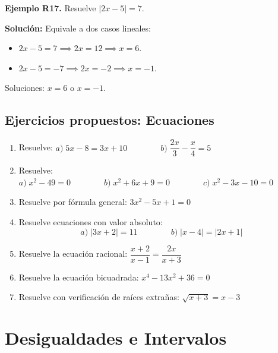 \documentclass[12pt, letterpaper]{article}
\begin{document}
\newpage

\textbf{Ejemplo R17.} Resuelve $|2x - 5| = 7$.

\begin{cuadrosolucion}
      \textbf{Solución:}
      Equivale a dos casos lineales:
      \begin{itemize}
            \item $2x - 5 = 7 \implies 2x = 12 \implies x = 6$.
            \item $2x - 5 = -7 \implies 2x = -2 \implies x = -1$.
      \end{itemize}
      Soluciones: $x = 6$ o $x = -1$.
\end{cuadrosolucion}

\subsection{Ejercicios propuestos: Ecuaciones}

\begin{enumerate}[resume=ejercicios, leftmargin=*]
      \item \facil{} Resuelve: $a)\; 5x - 8 = 3x + 10 \qquad\qquad b)\; \dfrac{2x}{3} - \dfrac{x}{4} = 5$

      \item \facil{} Resuelve: $a)\; x^2 - 49 = 0 \qquad\qquad b)\; x^2 + 6x + 9 = 0 \qquad\qquad c)\; x^2 - 3x - 10 = 0$

      \item \medio{} Resuelve por fórmula general: $3x^2 - 5x + 1 = 0$

      \item \medio{} Resuelve ecuaciones con valor absoluto:
            $$a)\; |3x + 2| = 11 \qquad\qquad b)\; |x - 4| = |2x + 1|$$

      \item \medio{} Resuelve la ecuación racional: $\dfrac{x + 2}{x - 1} = \dfrac{2x}{x + 3}$

      \item \dificil{} Resuelve la ecuación bicuadrada: $x^4 - 13x^2 + 36 = 0$

      \item \dificil{} Resuelve con verificación de raíces extrañas: $\sqrt{x + 3} = x - 3$
\end{enumerate}


\section{Desigualdades e Intervalos}
\end{document}
